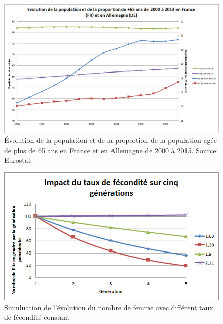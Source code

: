 \begin{figure}[p]
    \begin{center}
        \includegraphics[scale=0.55]{document/fr-de_comparaison.png}
        \caption{Évolution de la population et de la proportion de la population agée de plus de 65 ans en France et en Allemagne de 2000 à 2015. Source: Eurostat\citep{eurostat_pop}}
        \label{fr-de_comparaison}
    \end{center}
\end{figure}

\begin{figure}[p]
    \begin{center}
        \includegraphics[scale=0.8]{document/fecondite.png}
        \caption{Simuluation de l'évolution du nombre de femme avec différent taux de fécondité constant}
        \label{fecondite}
    \end{center}
\end{figure}

